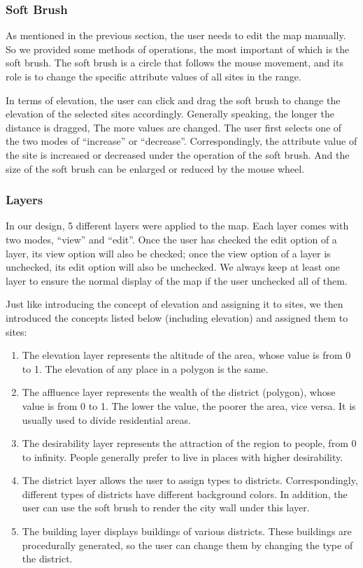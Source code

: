 \subsubsection{Soft Brush}
As mentioned in the previous section, the user needs to edit the map manually. So we provided some methods of operations, the most important of which is the soft brush. The soft brush is a circle that follows the mouse movement, and its role is to change the specific attribute values of all sites in the range.

In terms of elevation, the user can click and drag the soft brush to change the elevation of the selected sites accordingly. Generally speaking, the longer the distance is dragged, The more values are changed. The user first selects one of the two modes of ``increase'' or ``decrease''. Correspondingly, the attribute value of the site is increased or decreased under the operation of the soft brush. And the size of the soft brush can be enlarged or reduced by the mouse wheel.

\subsubsection{Layers}
In our design, 5 different layers were applied to the map. Each layer comes with two modes, ``view'' and ``edit''. Once the user has checked the edit option of a layer, its view option will also be checked; once the view option of a layer is unchecked, its edit option will also be unchecked. We always keep at least one layer to ensure the normal display of the map if the user unchecked all of them.

Just like introducing the concept of elevation and assigning it to sites, we then introduced the concepts listed below (including elevation) and assigned them to sites:

\begin{enumerate}
  \item The elevation layer represents the altitude of the area, whose value is from 0 to 1. The elevation of any place in a polygon is the same.
  \item The affluence layer represents the wealth of the district (polygon), whose value is from 0 to 1. The lower the value, the poorer the area, vice versa. It is usually used to divide residential areas.
  \item The desirability layer represents the attraction of the region to people, from 0 to infinity. People generally prefer to live in places with higher desirability.
  \item The district layer allows the user to assign types to districts. Correspondingly, different types of districts have different background colors. In addition, the user can use the soft brush to render the city wall under this layer.
  \item The building layer displays buildings of various districts. These buildings are procedurally generated, so the user can change them by changing the type of the district.
\end{enumerate}

